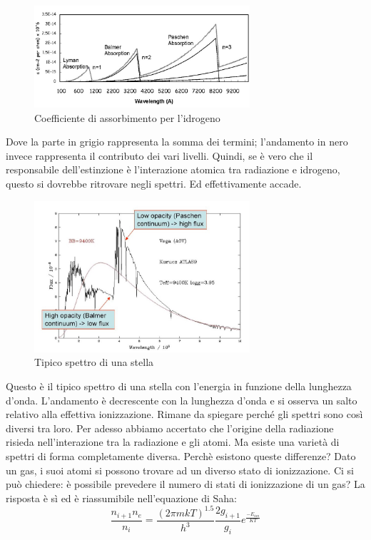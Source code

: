 \documentclass[a4paper,11pt]{article}
\begin{document}
     \begin{figure}[h!!]
        \centering
        \includegraphics[width=8cm]{Coeffciente_di_assorbimento.jpg}
        \caption{Coefficiente di assorbimento per l'idrogeno}
        \label{fig: coefficiente di assorbimento }
      \end{figure}
    \newpage
     Dove la parte in grigio rappresenta la somma dei termini; l'andamento in nero invece rappresenta il contributo dei vari livelli. Quindi, se è vero che il responsabile dell'estinzione è l'interazione atomica tra radiazione e idrogeno, questo si dovrebbe ritrovare negli spettri. Ed effettivamente accade.
     
     \begin{figure}[h!!]
        \centering
        \includegraphics[width=8cm]{spettro_stella.jpg}
        \caption{Tipico spettro di una stella}
        \label{fig: spettro di una stella }
      \end{figure}

    Questo è il tipico spettro di una stella con l'energia in funzione della lunghezza d'onda. L'andamento è decrescente con la lunghezza d'onda e si osserva un salto relativo alla effettiva ionizzazione.  Rimane da spiegare perché gli spettri sono così diversi tra loro. Per adesso abbiamo accertato che l'origine della radiazione risieda nell'interazione tra la radiazione e gli atomi. Ma esiste una varietà di spettri di forma completamente diversa. Perchè esistono queste differenze?
    Dato un gas, i suoi atomi si possono trovare ad un diverso stato di ionizzazione. Ci si può chiedere: è possibile prevedere il numero di stati di ionizzazione di un gas? La risposta è sì ed è riassumibile nell'equazione di Saha:
    $$
        \frac{n_{i+1}n_{e}}{n_{i}}= \frac{(2{\pi}mkT)^{1.5}}{h^3} \frac{2g_{i+1}}{g_{i}}e^{\frac{-E_{ion}}{KT}}
    $$
\end{document}
